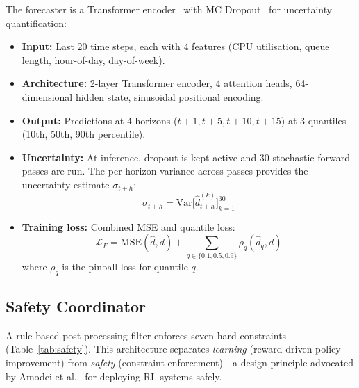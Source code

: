 \documentclass[conference]{IEEEtran}
\begin{document}
The forecaster is a Transformer encoder~\cite{vaswani2017attention} with
MC Dropout~\cite{gal2016dropout} for uncertainty quantification:
\begin{itemize}[leftmargin=*]
  \item \textbf{Input:} Last 20 time steps, each with 4 features (CPU
        utilisation, queue length, hour-of-day, day-of-week).
  \item \textbf{Architecture:} 2-layer Transformer encoder, 4 attention heads,
        64-dimensional hidden state, sinusoidal positional encoding.
  \item \textbf{Output:} Predictions at 4 horizons ($t{+}1, t{+}5, t{+}10,
        t{+}15$) at 3 quantiles (10th, 50th, 90th percentile).
  \item \textbf{Uncertainty:} At inference, dropout is kept active and 30
        stochastic forward passes are run.  The per-horizon variance across
        passes provides the uncertainty estimate $\sigma_{t+h}$:
        \begin{equation}
          \sigma_{t+h} = \text{Var}\big[\hat{d}^{(k)}_{t+h}\big]_{k=1}^{30}
        \end{equation}
  \item \textbf{Training loss:} Combined MSE and quantile loss:
        \begin{equation}
          \mathcal{L}_F = \text{MSE}(\hat{d}, d) + \sum_{q \in \{0.1, 0.5, 0.9\}} \rho_q(\hat{d}_q, d)
        \end{equation}
        where $\rho_q$ is the pinball loss for quantile $q$.
\end{itemize}

\subsection{Safety Coordinator}

A rule-based post-processing filter enforces seven hard constraints
(Table~\ref{tab:safety}).  This architecture separates \emph{learning}
(reward-driven policy improvement) from \emph{safety} (constraint
enforcement)---a design principle advocated by Amodei et
al.~\cite{amodei2016concrete} for deploying RL systems safely.
\end{document}
